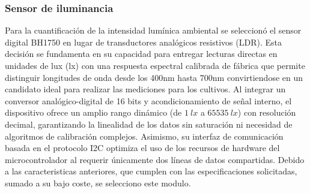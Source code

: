 \subsubsection{Sensor de iluminancia}
Para la cuantificación de la intensidad lumínica ambiental se seleccionó el sensor digital BH1750 en lugar de transductores analógicos resistivos (LDR). Esta decisión se fundamenta en su capacidad para entregar lecturas directas en unidades de lux (lx) con una respuesta espectral calibrada de fábrica que permite distinguir longitudes de onda desde los 400nm hasta 700nm convirtiendose en un candidato ideal para realizar las mediciones para los cultivos. Al integrar un conversor analógico-digital de 16 bits y acondicionamiento de señal interno, el dispositivo ofrece un amplio rango dinámico (de $1\ lx$ a $65535\ lx$) con resolución decimal, garantizando la linealidad de los datos sin saturación ni necesidad de algoritmos de calibración complejos. Asimismo, su interfaz de comunicación basada en el protocolo I2C optimiza el uso de los recursos de hardware del microcontrolador al requerir únicamente dos líneas de datos compartidas. Debido a las caracteristicas anteriores, que cumplen con las especificaciones solicitadas, sumado a su bajo coste, se selecciono este modulo.


